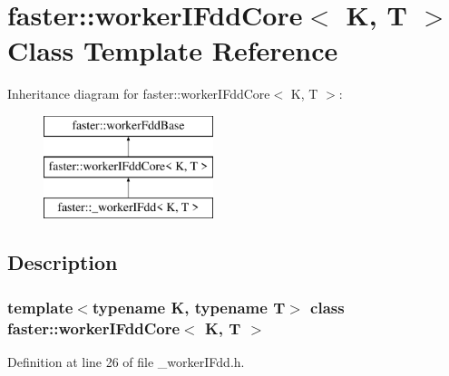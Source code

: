 \hypertarget{classfaster_1_1workerIFddCore}{}\section{faster\+:\+:worker\+I\+Fdd\+Core$<$ K, T $>$ Class Template Reference}
\label{classfaster_1_1workerIFddCore}
Inheritance diagram for faster\+:\+:worker\+I\+Fdd\+Core$<$ K, T $>$\+:\begin{figure}[H]
\begin{center}
\leavevmode
\includegraphics[height=3.000000cm]{classfaster_1_1workerIFddCore}
\end{center}
\end{figure}


\subsection{Description}
\subsubsection*{template$<$typename K, typename T$>$\newline
class faster\+::worker\+I\+Fdd\+Core$<$ K, T $>$}



Definition at line 26 of file \+\_\+worker\+I\+Fdd.\+h.

